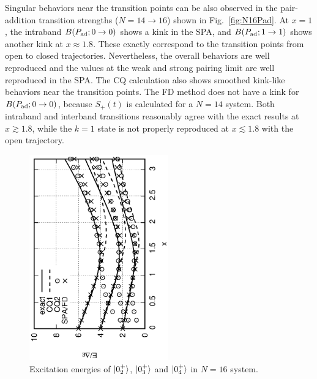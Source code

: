 \documentclass[%
superscriptaddress,
preprint,
showpacs,
nofootinbib,
amsmath,amssymb,
prc,
floatfix ]%
{revtex4-1}
\begin{document}
Singular behaviors near the transition points can be also observed in
the pair-addition transition strengths ($N=14\rightarrow 16$) shown
in Fig.~\ref{fig:N16Pad}. 
At $x=1$, the intraband $B(P_{\rm ad}; 0\rightarrow 0)$ shows a kink
in the SPA,
and $B(P_{\rm ad}; 1\rightarrow 1)$ shows another kink at $x\approx 1.8$.
These exactly correspond to the transition points from open to closed
trajectories.
Nevertheless, the overall behaviors are well reproduced and
the values at the weak and strong pairing limit are well reproduced
in the SPA.
The CQ calculation also shows smoothed kink-like behaviors near the
transition points.
The FD method does not have a kink for $B(P_{\rm ad}; 0\rightarrow 0)$,
because $S_+(t)$ is calculated for a $N=14$ system.
Both intraband and interband transitions reasonably agree with
the exact results at $x\gtrsim 1.8$,
while the $k=1$ state is not properly reproduced at $x\lesssim 1.8$
with the open trajectory.


\begin{figure}[htbp]
 \begin{center}
  \includegraphics[width=60mm,angle=-90]{images/N16ex_energy2.eps}
 \end{center}
 \caption{Excitation energies of $\ket{0_2^+}$, $\ket{0_3^+}$ and $\ket{0_4^+}$ in $N=16$ system.}
 \label{fig:N16energy}
\end{figure}
\end{document}
